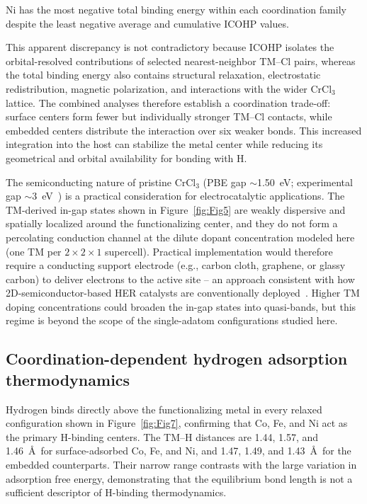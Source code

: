 \documentclass[journal=jacsat,manuscript=article]{achemso}
\begin{document}
Ni has the most negative total binding energy within each coordination family despite the least negative average and cumulative ICOHP values.

This apparent discrepancy is not contradictory because ICOHP isolates the orbital-resolved contributions of selected nearest-neighbor TM--Cl pairs, whereas the total binding energy also contains structural relaxation, electrostatic redistribution, magnetic polarization, and interactions with the wider CrCl$_3$ lattice. The combined analyses therefore establish a coordination trade-off: surface centers form fewer but individually stronger TM--Cl contacts, while embedded centers distribute the interaction over six weaker bonds. This increased integration into the host can stabilize the metal center while reducing its geometrical and orbital availability for bonding with H.

{\color{revcolor}%
  The semiconducting nature of pristine CrCl$_3$ (PBE gap $\sim$1.50~eV; experimental gap $\sim$3~eV~\cite{Mastrippolito2021, Webster2018}) is a practical consideration for electrocatalytic applications. The TM-derived in-gap states shown in Figure~\ref{fig:Fig5} are weakly dispersive and spatially localized around the functionalizing center, and they do not form a percolating conduction channel at the dilute dopant concentration modeled here (one TM per $2\times2\times1$ supercell). Practical implementation would therefore require a conducting support electrode (e.g., carbon cloth, graphene, or glassy carbon) to deliver electrons to the active site -- an approach consistent with how 2D-semiconductor-based HER catalysts are conventionally deployed~\cite{Ipaves2025,Liao2022}. Higher TM doping concentrations could broaden the in-gap states into quasi-bands, but this regime is beyond the scope of the single-adatom configurations studied here.
\par}

\subsection{Coordination-dependent hydrogen adsorption thermodynamics}

\noindent Hydrogen binds directly above the functionalizing metal in every relaxed configuration shown in Figure~\ref{fig:Fig7}, confirming that Co, Fe, and Ni act as the primary H-binding centers. The TM--H distances are 1.44, 1.57, and 1.46~\AA\ for surface-adsorbed Co, Fe, and Ni, and 1.47, 1.49, and 1.43~\AA\ for the embedded counterparts. Their narrow range contrasts with the large variation in adsorption free energy, demonstrating that the equilibrium bond length is not a sufficient descriptor of H-binding thermodynamics.
\end{document}
